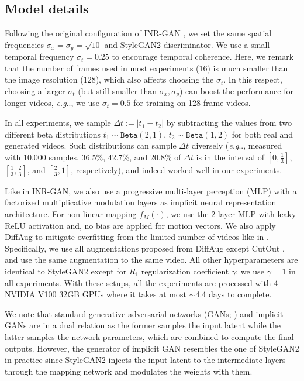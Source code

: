 \documentclass{article} \usepackage{iclr2022_conference,times}
\makeatletter
\DeclareRobustCommand\onedot{\futurelet\@let@token\@onedot}
\def\@onedot{\ifx\@let@token.\else.\null\fi\xspace}
\def\eg{\emph{e.g}\onedot} \def\Eg{\emph{E.g}\onedot}
\makeatother
\begin{document}
\subsection{Model details}
\label{appen:details-model}
Following the original configuration of INR-GAN \citep{skorokhodov2021adversarial}, we set the same spatial frequencies $\sigma_x = \sigma_y = \sqrt{10}$ and StyleGAN2 \citep{karras2020analyzing} discriminator. We use a small temporal frequency $\sigma_t=0.25$ to encourage temporal coherence. Here, we remark that the number of frames used in most experiments (16) is much smaller than the image resolution (128), which also affects choosing the $\sigma_t$. In this respect, choosing a larger $\sigma_t$ (but still smaller than $\sigma_x, \sigma_y$) can boost the performance for longer videos, \eg, we use $\sigma_t=0.5$ for training on 128 frame videos. 

In all experiments, we sample $\Delta t := |t_1 - t_2|$ by subtracting the values from  two different beta distributions $t_1 \sim \mathtt{Beta}(2,1)$, $t_2 \sim \mathtt{Beta}(1,2)$ for both real and generated videos. Such distributions can sample $\Delta t$ diversely (\eg, measured with 10,000 samples, 36.5\%, 42.7\%, and 20.8\% of $\Delta t$ is in the interval of $[0,\frac{1}{3}]$, $[\frac{1}{3}, \frac{2}{3}]$, and $[\frac{2}{3}, 1]$, respectively), and indeed worked well in our experiments.


Like in INR-GAN, we also use a progressive multi-layer perception (MLP) with a factorized multiplicative modulation layers as implicit neural representation architecture.  
For non-linear mapping $f_M(\cdot)$, we use the 2-layer MLP with leaky ReLU activation and, no bias are applied for motion vectors. We also apply DiffAug \citep{zhao2020differentiable} to mitigate overfitting from the limited number of videos like in \citet{tian2021good}. Specifically, we use all augmentations proposed from DiffAug except CutOut \citep{devries2017improved}, and use the same augmentation to the same video. All other hyperparameters are identical to StyleGAN2 except for $R_1$ regularization coefficient $\gamma$: we use $\gamma=1$ in all experiments. With these setups, all the experiments are processed with 4 NVIDIA V100 32GB GPUs where it takes at most $\sim$4.4 days to complete.

We note that standard generative adversarial networks (GANs; \citet{goodfellow2014generative}) and implicit GANs are in a dual relation as the former samples the input latent while the latter samples the network parameters, which are combined to compute the final outputs. However, the generator of implicit GAN resembles the one of StyleGAN2 in practice since StyleGAN2 injects the input latent to the intermediate layers through the mapping network and modulates the weights with them.
\end{document}
